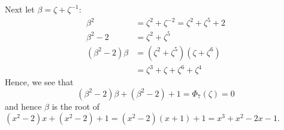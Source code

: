 \documentclass{../../mathnotes}
\begin{document}
\begin{enumerate}[(i)]
        Next let $\beta=\zeta+\zeta^{-1}$:
        \begin{align*}
            \beta^2&=\zeta^2+\zeta^{-2}=\zeta^2+\zeta^5+2\\
            \beta^2-2&=\zeta^2+\zeta^5\\
            (\beta^2-2)\beta&=\left( \zeta^2+\zeta^5 \right)\left( \zeta+\zeta^6 \right)\\
            &=\zeta^3+\zeta+\zeta^6+\zeta^4
        \end{align*}
        Hence, we see that
        \[(\beta^2-2)\beta+\left( \beta^2-2 \right)+1=\Phi_7(\zeta)=0\]
        and hence $\beta$ is the root of $(x^2-2)x+(x^2-2)+1=(x^2-2)(x+1)+1=x^3+x^2-2x-1$.
\end{enumerate}
\end{document}
